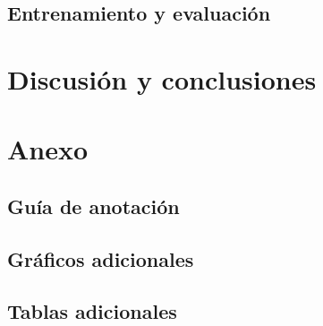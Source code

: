 \documentclass[colorinlistoftodos]{article}
\begin{document}
\subsection{Entrenamiento y evaluación}\label{subsection-results-models}


%


\section{Discusi\'on y conclusiones}\label{section-discussion}




\clearpage
\appendix
\section{Anexo}\label{appendix}

\subsection{Guía de anotación}\label{appendix-annotation}


\subsection{Gráficos adicionales}\label{appendix-plots}


\subsection{Tablas adicionales}\label{appendix-tables}


\end{document}

